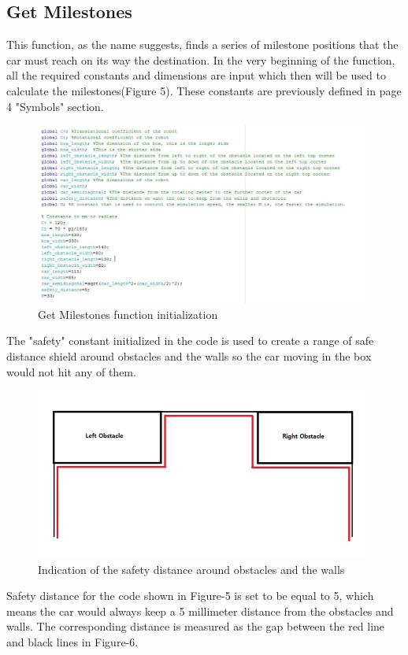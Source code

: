 \documentclass[12pt, letterpaper]{amsart} %
\numberwithin{equation}{section}
\begin{document}
\subsection{Get Milestones}
This function, as the name suggests, finds a series of milestone positions that the car must reach on its way the destination.
In the very beginning of the function, all the required constants and dimensions are input which then will be used to calculate the milestones(Figure 5). These constants are previously defined in page 4 "Symbols" section. 
\\
\begin{figure}[h!]
\includegraphics[width=110mm]{./img/fig_5.png}
\caption{Get Milestones function initialization}
\label{fig:figure5}
\end{figure}

The "safety" constant initialized in the code is used to create a range of safe distance shield around obstacles and the walls so the car moving in the box would not hit any of them. 

\begin{figure}[h!]
\includegraphics[width=110mm]{./img/fig_6.png}
\caption{Indication of the safety distance around obstacles and the walls}
\label{fig:figure6}	
\end{figure}

\newpage
Safety distance for the code shown in Figure-5 is set
to be equal to 5, which means the car would always keep
a 5 millimeter distance from the obstacles and walls.
The corresponding distance is measured as the gap
between the red line and black lines in Figure-6.
\end{document}
